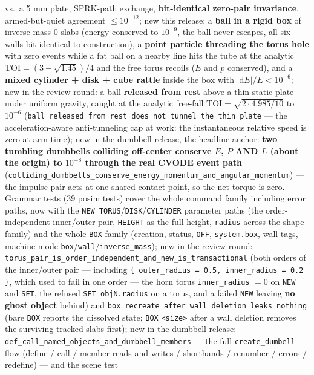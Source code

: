 \documentclass[11pt]{article}
\newcommand{\kw}[1]{\texttt{\uppercase{#1}}}
\newcommand{\code}[1]{\texttt{#1}}
\begin{document}
vs.\ a 5 mm plate, SPRK-path exchange, \textbf{bit-identical zero-pair
invariance}, armed-but-quiet agreement $\le 10^{-12}$; new this release: a
\textbf{ball in a rigid box} of inverse-mass-0 slabs (energy conserved to
$10^{-9}$, the ball never escapes, all six walls bit-identical to
construction), a \textbf{point particle threading the torus hole} with zero
events while a fat ball on a nearby line hits the tube at the analytic
$\mathrm{TOI} = (3 - \sqrt{1.45})/4$ and the free torus recoils ($E$ and $p$
conserved), and a \textbf{mixed cylinder + disk + cube rattle} inside the
box with $|\mathrm dE|/E < 10^{-6}$; new in the review round: a ball
\textbf{released from rest} above a thin static plate under uniform
gravity, caught at the analytic free-fall
$\mathrm{TOI} = \sqrt{2 \cdot 4.985/10}$ to $10^{-6}$
(\code{ball\_released\_from\_rest\_does\_not\_tunnel\_the\_thin\_plate}
--- the acceleration-aware anti-tunneling cap at work: the instantaneous
relative speed is zero at arm time); new in the dumbbell release, the
headline anchor: \textbf{two tumbling dumbbells colliding off-center
conserve $E$, $P$ AND $L$ (about the origin) to $10^{-8}$ through the real
CVODE event path}
(\code{colliding\_dumbbells\_conserve\_energy\_momentum\_and\_angular\_momentum})
--- the impulse pair acts at one shared contact point, so the net torque is
zero. Grammar tests (39 posim tests) cover
the whole command family including error paths, now with the
\kw{new torus}/\kw{disk}/\kw{cylinder} parameter paths (the
order-independent inner/outer pair, \kw{height} as the full height,
\code{radius} across the shape family) and the whole \kw{box} family
(creation, status, \kw{off}, \code{system.box}, wall tags, machine-mode
\code{box}/\code{wall}/\code{inverse\_mass}); new in the review round:
\code{torus\_pair\_is\_order\_independent\_and\_new\_is\_transactional}
(both orders of the inner/outer pair --- including
\code{\{ outer\_radius = 0.5, inner\_radius = 0.2 \}}, which used to fail
in one order --- the horn torus \code{inner\_radius} $= 0$ on \kw{new} and
\kw{set}, the refused \code{SET objN.radius} on a torus, and a failed
\kw{new} leaving \textbf{no ghost object} behind) and
\code{box\_recreate\_after\_wall\_deletion\_leaks\_nothing} (bare \kw{box}
reports the dissolved state; \kw{box} \code{<size>} after a wall deletion
removes the surviving tracked slabs first); new in the dumbbell release:
\code{def\_call\_named\_objects\_and\_dumbbell\_members} --- the full
\code{create\_dumbell} flow (define / call / member reads and writes /
shorthands / renumber / errors / redefine) --- and the scene test
\end{document}
